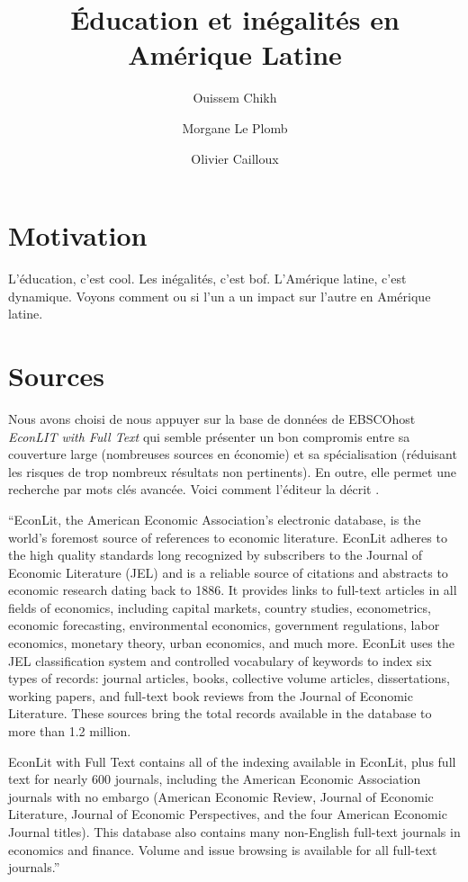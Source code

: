 \documentclass[pagesize, twoside=off, bibliography=totoc, DIV=calc, fontsize=12pt, a4paper, french]{scrartcl}
\title{Éducation et inégalités en Amérique Latine}
\author{Ouissem Chikh}
\author{Morgane Le Plomb}
\author{Olivier Cailloux}
\affil{Université Paris-Dauphine, PSL Research University, CNRS, LAMSADE, 75016 PARIS, FRANCE}
\begin{document}
\maketitle

\section{Motivation}
\label{sec:motiv}
L’éducation, c’est cool.
Les inégalités, c’est bof.
L’Amérique latine, c’est dynamique.
Voyons comment ou si l’un a un impact sur l’autre en Amérique latine.

\section{Sources}
Nous avons choisi de nous appuyer sur la base de données de EBSCOhost \emph{EconLIT with Full Text} qui semble présenter un bon compromis entre sa couverture large (nombreuses sources en économie) et sa spécialisation (réduisant les risques de trop nombreux résultats non pertinents). En outre, elle permet une recherche par mots clés avancée.
Voici comment l’éditeur la décrit \citep{ebscohost_econlit_2024}.

“EconLit, the American Economic Association's electronic database, is the world's foremost source of references to economic literature. EconLit adheres to the high quality standards long recognized by subscribers to the Journal of Economic Literature (JEL) and is a reliable source of citations and abstracts to economic research dating back to 1886. It provides links to full-text articles in all fields of economics, including capital markets, country studies, econometrics, economic forecasting, environmental economics, government regulations, labor economics, monetary theory, urban economics, and much more. EconLit uses the JEL classification system and controlled vocabulary of keywords to index six types of records: journal articles, books, collective volume articles, dissertations, working papers, and full-text book reviews from the Journal of Economic Literature. These sources bring the total records available in the database to more than 1.2 million.

EconLit with Full Text contains all of the indexing available in EconLit, plus full text for nearly 600 journals, including the American Economic Association journals with no embargo (American Economic Review, Journal of Economic Literature, Journal of Economic Perspectives, and the four American Economic Journal titles). This database also contains many non-English full-text journals in economics and finance. Volume and issue browsing is available for all full-text journals.”
\end{document}
